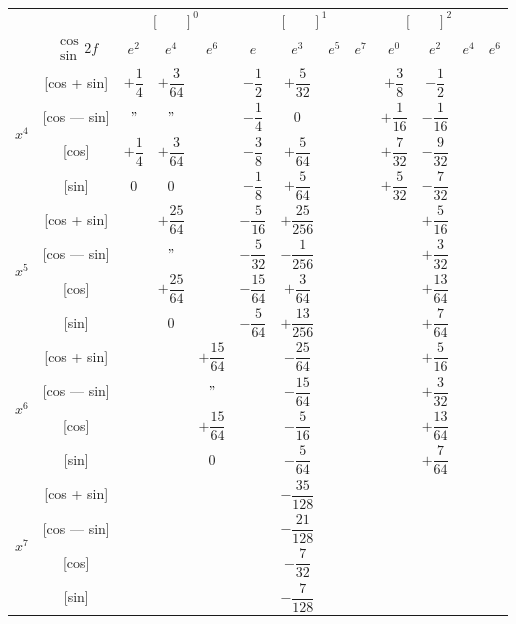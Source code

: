 \documentclass[11pt,a4paper]{book}
\begin{document}
{{\vspace{1em}


\begin{center}
\small
\begin{tabular}{|c|c|c|c|c|c|c|c|c|c|c|c|}
\hline
& &  &  &  \\
& $\begin{smallmatrix} \cos \\ \sin \end{smallmatrix} 2f$ & $e^2$ & $e^4$ & $e^6$ & $e$ & $e^3$ & $e^5$ & $e^7$ & $e^0$ & $e^2$ & $e^4$ & $e^6$ \\
\hline
{} & [cos + sin] & $+\dfrac{1}{4}$ & $+\dfrac{3}{64}$ & & $-\dfrac{1}{2}$ & $+\dfrac{5}{32}$ & & & $+\dfrac{3}{8}$ & $-\dfrac{1}{2}$ \\
& [cos --- sin] & $"$ & $"$ & & $-\dfrac{1}{4}$ & $0$ & & & $+\dfrac{1}{16}$ & $-\dfrac{1}{16}$ \\
& [cos] & $+\dfrac{1}{4}$ & $+\dfrac{3}{64}$ & & $-\dfrac{3}{8}$ & $+\dfrac{5}{64}$ & & & $+\dfrac{7}{32}$ & $-\dfrac{9}{32}$ \\
& [sin] & $0$ & $0$ & & $-\dfrac{1}{8}$ & $+\dfrac{5}{64}$ & & & $+\dfrac{5}{32}$ & $-\dfrac{7}{32}$ \\
\hline
{} & [cos + sin] & & $+\dfrac{25}{64}$ & & $-\dfrac{5}{16}$ & $+\dfrac{25}{256}$ & & & & $+\dfrac{5}{16}$ \\
& [cos --- sin] & & $"$ & & $-\dfrac{5}{32}$ & $-\dfrac{1}{256}$ & & & & $+\dfrac{3}{32}$ \\
& [cos] & & $+\dfrac{25}{64}$ & & $-\dfrac{15}{64}$ & $+\dfrac{3}{64}$ & & & & $+\dfrac{13}{64}$ \\
& [sin] & & $0$ & & $-\dfrac{5}{64}$ & $+\dfrac{13}{256}$ & & & & $+\dfrac{7}{64}$ \\
\hline
{} & [cos + sin] & & & $+\dfrac{15}{64}$ & & $-\dfrac{25}{64}$ & & & & $+\dfrac{5}{16}$ \\
& [cos --- sin] & & & $"$ & & $-\dfrac{15}{64}$ & & & & $+\dfrac{3}{32}$ \\
& [cos] & & & $+\dfrac{15}{64}$ & & $-\dfrac{5}{16}$ & & & & $+\dfrac{13}{64}$ \\
& [sin] & & & $0$ & & $-\dfrac{5}{64}$ & & & & $+\dfrac{7}{64}$ \\
\hline
{} & [cos + sin] & & & & & $-\dfrac{35}{128}$ & & & \\
& [cos --- sin] & & & & & $-\dfrac{21}{128}$ & & & \\
& [cos] & & & & & $-\dfrac{7}{32}$ & & & \\
& [sin] & & & & & $-\dfrac{7}{128}$ & & & \\
\hline
\end{tabular}
\end{center}

}}
\end{document}
